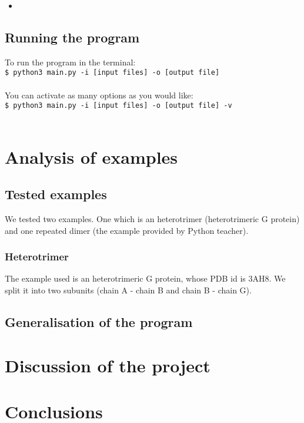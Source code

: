 \documentclass[a4paper,12pt]{report}
\begin{document}
\begin{itemize}
 \item 
\end{itemize}

\section{Running the program}

To run the program in the terminal:\\ \texttt{\$ python3 main.py -i [input files] -o [output file]} \\\\ You can activate as many options as you would like:\\ \texttt{\$ python3 main.py -i [input files] -o [output file] -v }\\\\



\chapter{Analysis of examples}

\section{Tested examples}

We tested two %
examples. One which is an heterotrimer (heterotrimeric G protein) and one repeated dimer (the example provided by Python teacher).

\subsection{Heterotrimer}

The example used is an heterotrimeric G protein, whose PDB id is 3AH8. We split it into two subunits (chain A - chain B and chain B - chain G).  

\section{Generalisation of the program}




\chapter{Discussion of the project}


\chapter{Conclusions}





\end{document}
